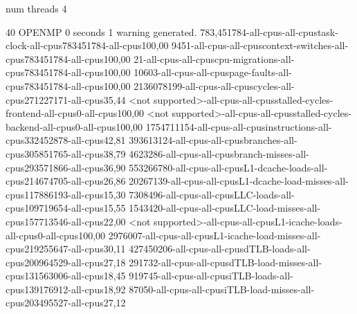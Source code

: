 num threads 4

40
OPENMP
0 seconds
1 warning generated.
783,451784-all-cpus-all-cpustask-clock-all-cpus783451784-all-cpus100,00
9451-all-cpus-all-cpuscontext-switches-all-cpus783451784-all-cpus100,00
21-all-cpus-all-cpuscpu-migrations-all-cpus783451784-all-cpus100,00
10603-all-cpus-all-cpuspage-faults-all-cpus783451784-all-cpus100,00
2136078199-all-cpus-all-cpuscycles-all-cpus271227171-all-cpus35,44
<not supported>-all-cpus-all-cpusstalled-cycles-frontend-all-cpus0-all-cpus100,00
<not supported>-all-cpus-all-cpusstalled-cycles-backend-all-cpus0-all-cpus100,00
1754711154-all-cpus-all-cpusinstructions-all-cpus332452878-all-cpus42,81
393613124-all-cpus-all-cpusbranches-all-cpus305851765-all-cpus38,79
4623286-all-cpus-all-cpusbranch-misses-all-cpus293571866-all-cpus36,90
553266780-all-cpus-all-cpusL1-dcache-loads-all-cpus214674705-all-cpus26,86
20267139-all-cpus-all-cpusL1-dcache-load-misses-all-cpus117886193-all-cpus15,30
7308496-all-cpus-all-cpusLLC-loads-all-cpus109719654-all-cpus15,55
1543420-all-cpus-all-cpusLLC-load-misses-all-cpus157713546-all-cpus22,00
<not supported>-all-cpus-all-cpusL1-icache-loads-all-cpus0-all-cpus100,00
2976007-all-cpus-all-cpusL1-icache-load-misses-all-cpus219255647-all-cpus30,11
427450206-all-cpus-all-cpusdTLB-loads-all-cpus200964529-all-cpus27,18
291732-all-cpus-all-cpusdTLB-load-misses-all-cpus131563006-all-cpus18,45
919745-all-cpus-all-cpusiTLB-loads-all-cpus139176912-all-cpus18,92
87050-all-cpus-all-cpusiTLB-load-misses-all-cpus203495527-all-cpus27,12
